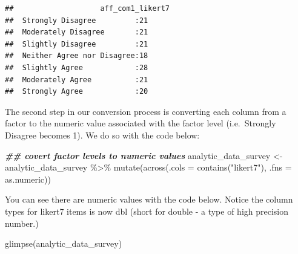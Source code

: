 \documentclass[
]{krantz}
\makeatletter
\newenvironment{Shaded}{\begin{snugshade}}{\end{snugshade}}
\newcommand{\AttributeTok}[1]{\textcolor[rgb]{0.61,0.61,0.61}{#1}}
\newcommand{\DocumentationTok}[1]{\textcolor[rgb]{0.37,0.37,0.37}{\textbf{\textit{#1}}}}
\newcommand{\FunctionTok}[1]{\textcolor[rgb]{0,0,0}{#1}}
\newcommand{\NormalTok}[1]{#1}
\newcommand{\OtherTok}[1]{\textcolor[rgb]{0.37,0.37,0.37}{#1}}
\newcommand{\SpecialCharTok}[1]{\textcolor[rgb]{0,0,0}{#1}}
\newcommand{\StringTok}[1]{\textcolor[rgb]{0.5,0.5,0.5}{#1}}
\newenvironment{kframe}{%
\medskip{}
\setlength{\fboxsep}{.8em}
 \def\at@end@of@kframe{}%
 \ifinner\ifhmode%
  \def\at@end@of@kframe{\end{minipage}}%
  \begin{minipage}{\columnwidth}%
 \fi\fi%
 \def\FrameCommand##1{\hskip\@totalleftmargin \hskip-\fboxsep
 \colorbox{shadecolor}{##1}\hskip-\fboxsep
     \hskip-\linewidth \hskip-\@totalleftmargin \hskip\columnwidth}%
 \MakeFramed {\advance\hsize-\width
   \@totalleftmargin\z@ \linewidth\hsize
   \@setminipage}}%
 {\par\unskip\endMakeFramed%
 \at@end@of@kframe}
\renewenvironment{Shaded}{\begin{kframe}}{\end{kframe}}
\makeatother
\begin{document}
\begin{verbatim}
##                    aff_com1_likert7
##  Strongly Disagree         :21     
##  Moderately Disagree       :21     
##  Slightly Disagree         :21     
##  Neither Agree nor Disagree:18     
##  Slightly Agree            :28     
##  Moderately Agree          :21     
##  Strongly Agree            :20
\end{verbatim}

The second step in our conversion process is converting each column from a factor to the numeric value associated with the factor level (i.e.~Strongly Disagree becomes 1). We do so with the code below:

\begin{Shaded}
\begin{Highlighting}[]
\DocumentationTok{\#\# covert factor levels to numeric values}
\NormalTok{analytic\_data\_survey }\OtherTok{\textless{}{-}}\NormalTok{ analytic\_data\_survey }\SpecialCharTok{\%\textgreater{}\%}
  \FunctionTok{mutate}\NormalTok{(}\FunctionTok{across}\NormalTok{(}\AttributeTok{.cols =} \FunctionTok{contains}\NormalTok{(}\StringTok{"likert7"}\NormalTok{), }
                \AttributeTok{.fns =}\NormalTok{ as.numeric))}
\end{Highlighting}
\end{Shaded}

You can see there are numeric values with the code below. Notice the column types for likert7 items is now dbl (short for double - a type of high precision number.)

\begin{Shaded}
\begin{Highlighting}[]
\FunctionTok{glimpse}\NormalTok{(analytic\_data\_survey)}
\end{Highlighting}
\end{Shaded}
\end{document}
